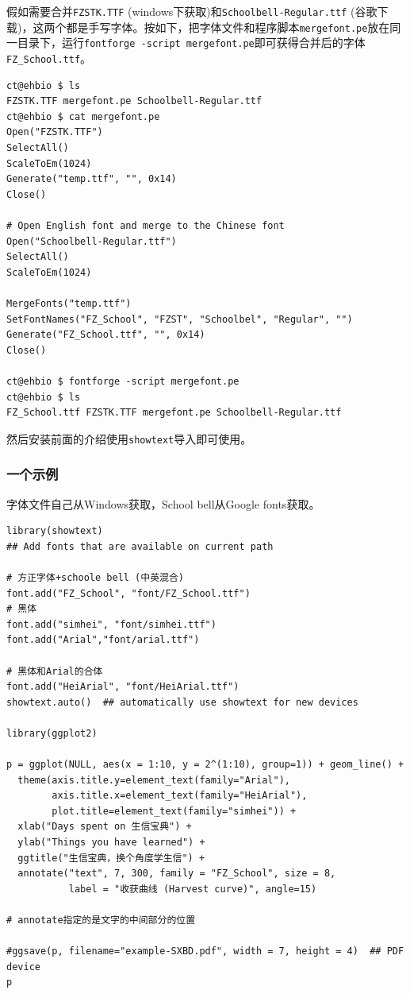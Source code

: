 \documentclass[]{article}
\numberwithin{figure}{section}
\numberwithin{table}{section}
\theoremstyle{definition}
\theoremstyle{definition}
\theoremstyle{definition}
\theoremstyle{remark}
\begin{document}
假如需要合并\texttt{FZSTK.TTF}
(windows下获取)和\texttt{Schoolbell-Regular.ttf}
(谷歌下载)，这两个都是手写字体。按如下，把字体文件和程序脚本\texttt{mergefont.pe}放在同一目录下，运行\texttt{fontforge\ -script\ mergefont.pe}即可获得合并后的字体\texttt{FZ\_School.ttf}。

\begin{verbatim}
ct@ehbio $ ls
FZSTK.TTF mergefont.pe Schoolbell-Regular.ttf
ct@ehbio $ cat mergefont.pe
Open("FZSTK.TTF")
SelectAll()
ScaleToEm(1024)
Generate("temp.ttf", "", 0x14)
Close()

# Open English font and merge to the Chinese font
Open("Schoolbell-Regular.ttf")
SelectAll()
ScaleToEm(1024)

MergeFonts("temp.ttf")
SetFontNames("FZ_School", "FZST", "Schoolbel", "Regular", "")
Generate("FZ_School.ttf", "", 0x14)
Close()

ct@ehbio $ fontforge -script mergefont.pe
ct@ehbio $ ls
FZ_School.ttf FZSTK.TTF mergefont.pe Schoolbell-Regular.ttf
\end{verbatim}

然后安装前面的介绍使用\texttt{showtext}导入即可使用。

\subsubsection{一个示例}

字体文件自己从Windows获取，School bell从Google fonts获取。

\begin{verbatim}
library(showtext)
## Add fonts that are available on current path

# 方正字体+schoole bell (中英混合)
font.add("FZ_School", "font/FZ_School.ttf")
# 黑体
font.add("simhei", "font/simhei.ttf")
font.add("Arial","font/arial.ttf")

# 黑体和Arial的合体
font.add("HeiArial", "font/HeiArial.ttf")
showtext.auto()  ## automatically use showtext for new devices

library(ggplot2)

p = ggplot(NULL, aes(x = 1:10, y = 2^(1:10), group=1)) + geom_line() +
  theme(axis.title.y=element_text(family="Arial"), 
        axis.title.x=element_text(family="HeiArial"), 
        plot.title=element_text(family="simhei")) +
  xlab("Days spent on 生信宝典") + 
  ylab("Things you have learned") +
  ggtitle("生信宝典，换个角度学生信") + 
  annotate("text", 7, 300, family = "FZ_School", size = 8,
           label = "收获曲线 (Harvest curve)", angle=15) 

# annotate指定的是文字的中间部分的位置

#ggsave(p, filename="example-SXBD.pdf", width = 7, height = 4)  ## PDF device
p
\end{verbatim}
\end{document}
